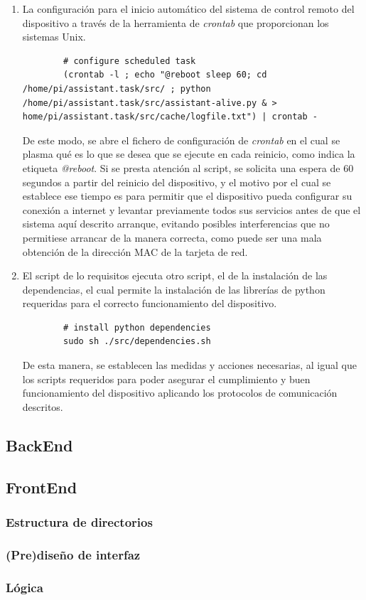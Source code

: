         \begin{enumerate}
            \item La configuración para el inicio automático del sistema de control remoto del dispositivo a través de la herramienta de \textit{crontab} que proporcionan los sistemas Unix.
            
        \begin{lstlisting}
        # configure scheduled task
        (crontab -l ; echo "@reboot sleep 60; cd /home/pi/assistant.task/src/ ; python /home/pi/assistant.task/src/assistant-alive.py & > home/pi/assistant.task/src/cache/logfile.txt") | crontab -
        \end{lstlisting}
        
        De este modo, se abre el fichero de configuración de \textit{crontab} en el cual se plasma qué es lo que se desea que se ejecute en cada reinicio, como indica la etiqueta \textit{@reboot}.
        Si se presta atención al script, se solicita una espera de 60 segundos a partir del reinicio del dispositivo, y el motivo por el cual se establece ese tiempo es para permitir que el dispositivo pueda configurar su conexión a internet y levantar previamente todos sus servicios antes de que el sistema aquí descrito arranque, evitando posibles interferencias que no permitiese arrancar de la manera correcta, como puede ser una mala obtención de la dirección MAC de la tarjeta de red.
        
        \item El script de lo requisitos ejecuta otro script, el de la instalación de las dependencias, el cual permite la instalación de las librerías de python requeridas para el correcto funcionamiento del dispositivo.
        
        \begin{lstlisting}
        # install python dependencies
        sudo sh ./src/dependencies.sh
        \end{lstlisting}
        
        De esta manera, se establecen las medidas y acciones necesarias, al igual que los scripts requeridos para poder asegurar el cumplimiento y buen funcionamiento del dispositivo aplicando los protocolos de comunicación descritos.
        
        \end{enumerate}


\subsection{BackEnd}

    
\subsection{FrontEnd}

    \subsubsection{Estructura de directorios}
    
    \subsubsection{ (Pre)diseño de interfaz }
    
    \subsubsection{ Lógica }